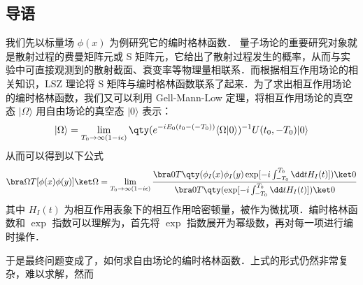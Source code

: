 
\subsection{导语}
我们先以标量场 $\phi(x)$ 为例研究它的编时格林函数．
量子场论的重要研究对象就是散射过程的费曼矩阵元或 S 矩阵元，它给出了散射过程发生的概率，从而与实验中可直接观测到的散射截面、衰变率等物理量相联系．而根据相互作用场论的相关知识，LSZ 理论将 S 矩阵与编时格林函数联系了起来．为了求出相互作用场论的编时格林函数，我们又可以利用 Gell-Mann-Low 定理，将相互作用场论的真空态 $|\Omega\rangle$ 用自由场论的真空态 $|0\rangle$ 表示：
\begin{equation}
|\Omega\rangle = \lim\limits_{T_0\rightarrow \infty(1-i\epsilon)}\qty(e^{-iE_0(t_0-(-T_0))}\langle \Omega|0\rangle )^{-1}U(t_0,-T_0)|0\rangle
\end{equation}
从而可以得到以下公式
\begin{equation}
\bra\Omega T[\phi(x)\phi(y)]\ket\Omega = \lim\limits_{T_0\rightarrow \infty(1-i\epsilon)}\frac{\bra 0 T\qty(\phi_I(x)\phi_I(y)\exp[-i\int_{-T_0}^{T_0}\dd t H_I(t)])\ket 0}{\bra 0 T\qty(\exp[-i\int_{-T_0}^{T_0}\dd t H_I(t)])\ket 0}
\end{equation}
其中 $H_I(t)$ 为相互作用表象下的相互作用哈密顿量，被作为微扰项．编时格林函数和 $\exp$ 指数可以理解为，首先将 $\exp$ 指数展开为幂级数，再对每一项进行编时操作．

于是最终问题变成了，如何求自由场论的编时格林函数．上式的形式仍然非常复杂，难以求解，然而